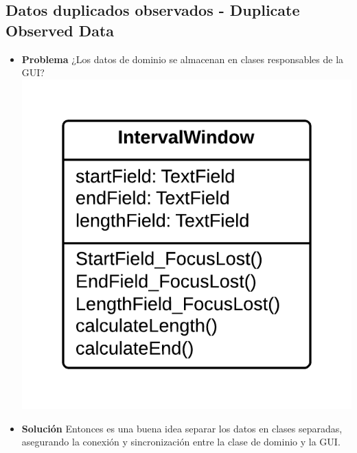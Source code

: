 \documentclass[11pt,a4paper,oneside]{book}
\begin{document}
\subsection{Datos duplicados observados - Duplicate Observed Data}
\label{duplicateobserveddata}
\begin{itemize}
    \item \textbf{Problema} ¿Los datos de dominio se almacenan en clases responsables de la GUI?\\
    \centering \includegraphics[scale=0.2]{duplicateobserveddataproblem}
    \item \textbf{Solución} Entonces es una buena idea separar los datos en clases separadas, asegurando la conexión y sincronización entre la clase de dominio y la GUI.\\

\end{itemize}
\end{document}

